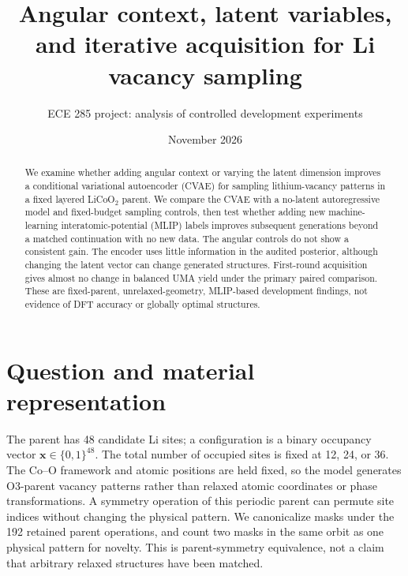 \documentclass[11pt]{article}
\title{Angular context, latent variables, and iterative acquisition for Li vacancy sampling}
\author{ECE 285 project: analysis of controlled development experiments}
\date{November 2026}
\begin{document}
\maketitle

\begin{abstract}
We examine whether adding angular context or varying the latent dimension improves a conditional variational autoencoder (CVAE) for sampling lithium-vacancy patterns in a fixed layered LiCoO$_2$ parent. We compare the CVAE with a no-latent autoregressive model and fixed-budget sampling controls, then test whether adding new machine-learning interatomic-potential (MLIP) labels improves subsequent generations beyond a matched continuation with no new data. The angular controls do not show a consistent gain. The encoder uses little information in the audited posterior, although changing the latent vector can change generated structures. First-round acquisition gives almost no change in balanced UMA yield under the primary paired comparison. These are fixed-parent, unrelaxed-geometry, MLIP-based development findings, not evidence of DFT accuracy or globally optimal structures.
\end{abstract}

\section{Question and material representation}
The parent has 48 candidate Li sites; a configuration is a binary occupancy vector $\mathbf{x}\in\{0,1\}^{48}$. The total number of occupied sites is fixed at 12, 24, or 36. The Co--O framework and atomic positions are held fixed, so the model generates O3-parent vacancy patterns rather than relaxed atomic coordinates or phase transformations. A symmetry operation of this periodic parent can permute site indices without changing the physical pattern. We canonicalize masks under the 192 retained parent operations, and count two masks in the same orbit as one physical pattern for novelty. This is parent-symmetry equivalence, not a claim that arbitrary relaxed structures have been matched.
\end{document}
